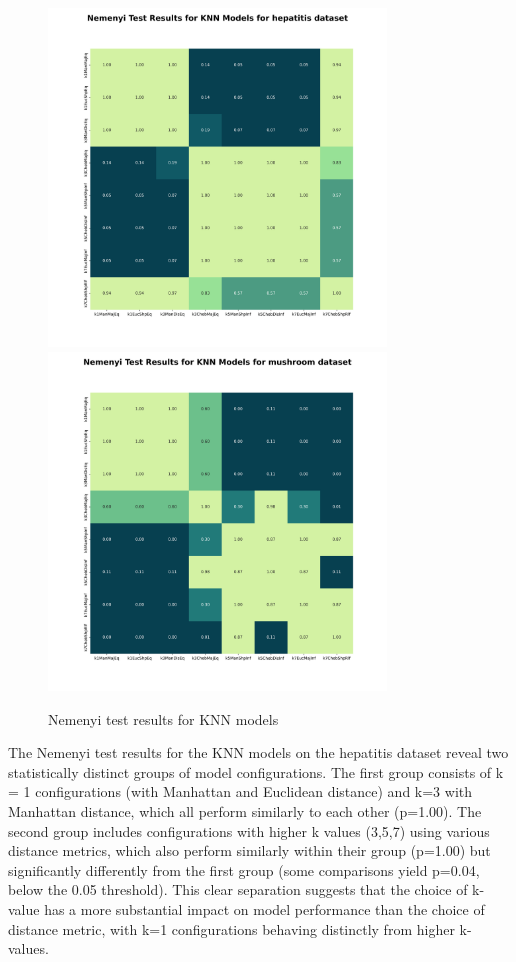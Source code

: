 \begin{figure}[!ht]
    \centering
    \includegraphics[width=0.8\textwidth]{figures/nemenyi_test_results_KNN_hepatitis.png}
    \includegraphics[width=0.8\textwidth]{figures/nemenyi_test_results_KNN_mushroom.png}
    \caption{Nemenyi test results for KNN models}
\label{fig:nemenyi-knn}
\end{figure}

The Nemenyi test results for the KNN models on the hepatitis dataset reveal two statistically distinct
groups of model configurations. The first group consists of k = 1 configurations
(with Manhattan and Euclidean distance) and k=3 with Manhattan distance, which all perform similarly to each other (p=1.00).
The second group includes configurations with higher k values (3,5,7) using various distance metrics,
which also perform similarly within their group (p=1.00) but significantly differently from the first
group (some comparisons yield p=0.04, below the 0.05 threshold). This clear separation suggests that the choice of k-value
has a more substantial impact on model performance than the choice of distance metric, with k=1 configurations behaving distinctly from higher k-values.


